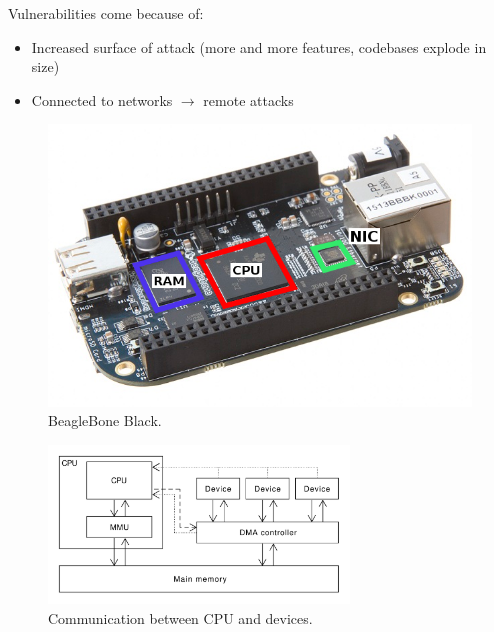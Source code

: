 \documentclass{beamer}
\begin{document}
\begin{frame}
    Vulnerabilities come because of:
    \begin{itemize}
        \item Increased surface of attack (more and more features, codebases explode in size)
        \item Connected to networks $\rightarrow$ remote attacks
    \end{itemize}
\end{frame}

\begin{frame}
    \begin{figure}
        \includegraphics[]{figures/BBB_cpu_ram_nic.png}
        \caption{BeagleBone Black.}
        \label{bbb_nic}
    \end{figure}
\end{frame}

\begin{frame}
    \begin{figure}
        \includegraphics[width=8cm]{../figures/cpu-memory-schema.pdf}
        \caption{Communication between CPU and devices.}
        \label{cpu_mem_schema}
    \end{figure}
\end{frame}
\end{document}
